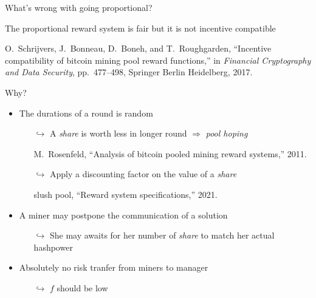 \documentclass{beamer}
\begin{document}
\begin{frame}{What's wrong with going proportional?}
\scriptsize
\begin{tcolorbox}[enhanced,drop shadow, title=Fact]
The proportional reward system is fair but it is not incentive compatible 
\end{tcolorbox}
\tiny
\begin{thebibliography}{1}

O.~Schrijvers, J.~Bonneau, D.~Boneh, and T.~Roughgarden, ``Incentive
  compatibility of bitcoin mining pool reward functions,'' in {\em Financial
  Cryptography and Data Security}, pp.~477--498, Springer Berlin Heidelberg,
  2017.

\end{thebibliography}
\scriptsize
Why?
\begin{itemize}
  \item The durations of a round is random 
  \begin{itemize}
    \scriptsize
    \item[$\hookrightarrow$] A \textit{share} is worth less in longer round $\Rightarrow$ \textit{pool hoping} \tiny
    \begin{thebibliography}{1}

M.~Rosenfeld, ``Analysis of bitcoin pooled mining reward systems,'' 2011.

\end{thebibliography}
\scriptsize
    \item[$\hookrightarrow$] Apply a discounting factor on the value of a \textit{share} \tiny
    \begin{thebibliography}{1}
slush pool, ``Reward system specifications,'' 2021.
\end{thebibliography}
  \end{itemize}
  \item A miner may postpone the communication of a solution
  \begin{itemize}
    \scriptsize
    \item[$\hookrightarrow$] She may awaits for her number of \textit{share} to match her actual hashpower 
  \end{itemize} 
  \item Absolutely no risk tranfer from miners to manager
    \begin{itemize}
    \scriptsize
    \item[$\hookrightarrow$] $f$ should be low 
  \end{itemize} 
\end{itemize}
\end{frame}
\end{document}
